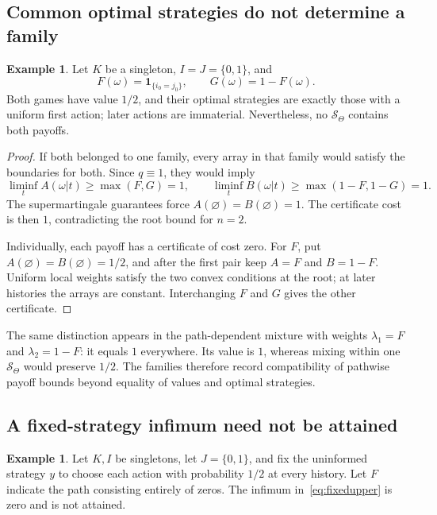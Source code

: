 \documentclass[11pt,a4paper]{article}
\theoremstyle{definition}
\newtheorem{example}[theorem]{Example}
\theoremstyle{remark}
\newcommand{\ind}{\mathbf 1}
\begin{document}
\subsection{Common optimal strategies do not determine a family}

\begin{example}\label{ex:matching}
Let $K$ be a singleton, $I=J=\{0,1\}$, and
\[
 F(\omega)=\ind_{\{i_0=j_0\}},\qquad G(\omega)=1-F(\omega).
\]
Both games have value $1/2$, and their optimal strategies are exactly
those with a uniform first action; later actions are immaterial.
Nevertheless, no $\mathcal S_\Theta$ contains both payoffs.
\end{example}

\begin{proof}
If both belonged to one family, every array in that family would
satisfy the boundaries for both. Since $q\equiv1$, they would imply
\[
 \liminf_tA(\omega|t)\geq\max(F,G)=1,\qquad
 \liminf_tB(\omega|t)\geq\max(1-F,1-G)=1.
\]
The supermartingale guarantees force $A(\varnothing)=B(\varnothing)=1$.
The certificate cost is then $1$, contradicting the root bound for
$n=2$.

Individually, each payoff has a certificate of cost zero. For $F$,
put $A(\varnothing)=B(\varnothing)=1/2$, and after the first pair
keep $A=F$ and $B=1-F$. Uniform local weights satisfy the two convex
conditions at the root; at later histories the arrays are constant.
Interchanging $F$ and $G$ gives the other certificate.
\end{proof}

The same distinction appears in the path-dependent mixture with
weights $\lambda_1=F$ and $\lambda_2=1-F$: it equals $1$ everywhere.
Its value is $1$, whereas mixing within one $\mathcal S_\Theta$
would preserve $1/2$. The families therefore record compatibility
of pathwise payoff bounds beyond equality of values and optimal
strategies.

\subsection{A fixed-strategy infimum need not be attained}

\begin{example}\label{ex:nonattainment}
Let $K,I$ be singletons, let $J=\{0,1\}$, and fix the uninformed
strategy $y$ to choose each action with probability $1/2$ at every
history. Let $F$ indicate the path consisting entirely of zeros.
The infimum in~\eqref{eq:fixedupper} is zero and is not attained.
\end{example}
\end{document}
